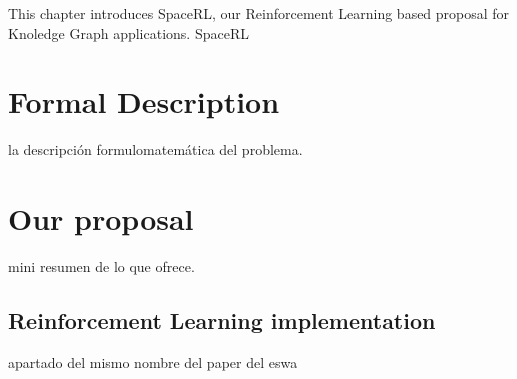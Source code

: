 
This chapter introduces SpaceRL, our Reinforcement Learning based proposal for Knoledge Graph applications. SpaceRL

\section{Formal Description}\label{sec:spacerl-formal_description}
la descripción formulomatemática del problema.

\section{Our proposal}\label{sec:spacerl-proposal}
mini resumen de lo que ofrece.


\subsection{Reinforcement Learning implementation}\label{sec:spacerl-rlimplementation}
apartado del mismo nombre del paper del eswa

